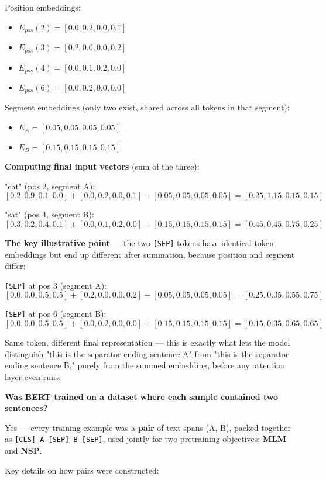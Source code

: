 Position embeddings:
\begin{itemize}
\item $E_{pos}(2) = [0.0, 0.2, 0.0, 0.1]$
\item $E_{pos}(3) = [0.2, 0.0, 0.0, 0.2]$
\item $E_{pos}(4) = [0.0, 0.1, 0.2, 0.0]$
\item $E_{pos}(6) = [0.0, 0.2, 0.0, 0.0]$
\end{itemize}

Segment embeddings (only two exist, shared across all tokens in that segment):
\begin{itemize}
\item $E_A = [0.05, 0.05, 0.05, 0.05]$
\item $E_B = [0.15, 0.15, 0.15, 0.15]$
\end{itemize}

\textbf{Computing final input vectors} (sum of the three):

"cat" (pos 2, segment A):
\[
[0.2,0.9,0.1,0.0] + [0.0,0.2,0.0,0.1] + [0.05,0.05,0.05,0.05] = [0.25, 1.15, 0.15, 0.15]
\]

"sat" (pos 4, segment B):
\[
[0.3,0.2,0.4,0.1] + [0.0,0.1,0.2,0.0] + [0.15,0.15,0.15,0.15] = [0.45, 0.45, 0.75, 0.25]
\]

\textbf{The key illustrative point} --- the two \texttt{[SEP]} tokens have identical token embeddings but end up different after summation, because position and segment differ:

\texttt{[SEP]} at pos 3 (segment A):
\[
[0.0,0.0,0.5,0.5] + [0.2,0.0,0.0,0.2] + [0.05,0.05,0.05,0.05] = [0.25, 0.05, 0.55, 0.75]
\]

\texttt{[SEP]} at pos 6 (segment B):
\[
[0.0,0.0,0.5,0.5] + [0.0,0.2,0.0,0.0] + [0.15,0.15,0.15,0.15] = [0.15, 0.35, 0.65, 0.65]
\]

Same token, different final representation --- this is exactly what lets the model distinguish "this is the separator ending sentence A" from "this is the separator ending sentence B," purely from the summed embedding, before any attention layer even runs.

\textbf{Was BERT trained on a dataset where each sample contained two sentences?}

Yes --- every training example was a \textbf{pair} of text spans (A, B), packed together as \texttt{[CLS] A [SEP] B [SEP]}, used jointly for two pretraining objectives: \textbf{MLM} and \textbf{NSP}.

Key details on how pairs were constructed:

